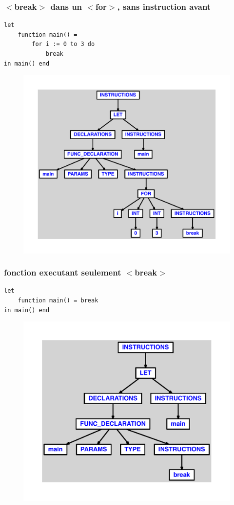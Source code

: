 \documentclass{article}
\begin{document}
\subsubsection{$ < $break$ > $ dans un $ < $for$ > $, sans instruction avant}
\begin{lstlisting}
let
	function main() =
		for i := 0 to 3 do
			break
in main() end
\end{lstlisting}
\newpage
\begin{figure}[H]
\centering
\includegraphics[max width=\textwidth]{ast/ast_10.pdf}
\end{figure}
\newpage
\subsubsection{fonction executant seulement $ < $break$ > $}
\begin{lstlisting}
let
	function main() = break
in main() end
\end{lstlisting}
\newpage
\begin{figure}[H]
\centering
\includegraphics[max width=\textwidth]{ast/ast_11.pdf}
\end{figure}
\newpage
\end{document}
